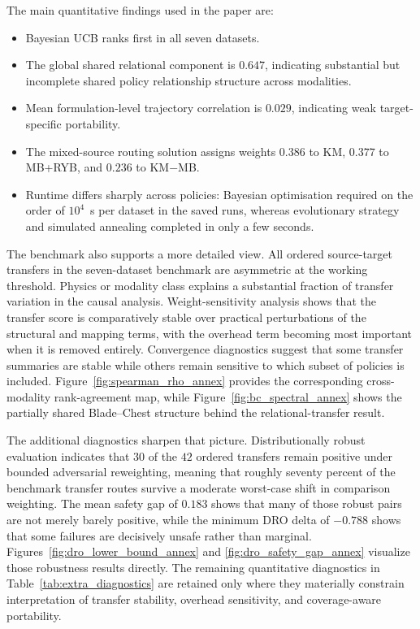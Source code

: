 \documentclass[twoside,twocolumn,9pt]{article}
\begin{document}
The main quantitative findings used in the paper are:
\begin{itemize}
\item Bayesian UCB ranks first in all seven datasets.
\item The global shared relational component is $0.647$, indicating substantial but incomplete shared policy relationship structure across modalities.
\item Mean formulation-level trajectory correlation is $0.029$, indicating weak target-specific portability.
\item The mixed-source routing solution assigns weights $0.386$ to KM, $0.377$ to MB+RYB, and $0.236$ to KM$-$MB.
\item Runtime differs sharply across policies: Bayesian optimisation required on the order of $10^4$~s per dataset in the saved runs, whereas evolutionary strategy and simulated annealing completed in only a few seconds.
\end{itemize}

The benchmark also supports a more detailed view. All ordered source-target transfers in the seven-dataset benchmark are asymmetric at the working threshold. Physics or modality class explains a substantial fraction of transfer variation in the causal analysis. Weight-sensitivity analysis shows that the transfer score is comparatively stable over practical perturbations of the structural and mapping terms, with the overhead term becoming most important when it is removed entirely. Convergence diagnostics suggest that some transfer summaries are stable while others remain sensitive to which subset of policies is included. Figure~\ref{fig:spearman_rho_annex} provides the corresponding cross-modality rank-agreement map, while Figure~\ref{fig:bc_spectral_annex} shows the partially shared Blade--Chest structure behind the relational-transfer result.

The additional diagnostics sharpen that picture. Distributionally robust evaluation indicates that $30$ of the $42$ ordered transfers remain positive under bounded adversarial reweighting, meaning that roughly seventy percent of the benchmark transfer routes survive a moderate worst-case shift in comparison weighting. The mean safety gap of $0.183$ shows that many of those robust pairs are not merely barely positive, while the minimum DRO delta of $-0.788$ shows that some failures are decisively unsafe rather than marginal. Figures~\ref{fig:dro_lower_bound_annex} and \ref{fig:dro_safety_gap_annex} visualize those robustness results directly. The remaining quantitative diagnostics in Table~\ref{tab:extra_diagnostics} are retained only where they materially constrain interpretation of transfer stability, overhead sensitivity, and coverage-aware portability.
\end{document}
